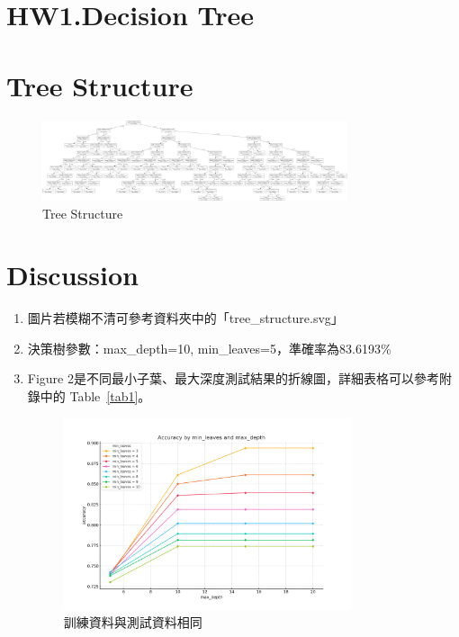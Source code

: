 \documentclass[11pt,a4paper]{extarticle}
\begin{document}
\section*{HW1.Decision Tree}

    \section*{Tree Structure}
    \begin{figure}[H]
        \centering
        \includegraphics[width=0.8\textwidth]{src/tree_structure.png}
        \caption{Tree Structure}
    \end{figure}

    \section*{Discussion}
    \begin{enumerate}
        \item 圖片若模糊不清可參考資料夾中的「tree\_structure.svg」
        \item 決策樹參數：max\_depth=10, min\_leaves=5，準確率為83.6193\%
        \item Figure 2是不同最小子葉、最大深度測試結果的折線圖，詳細表格可以參考附錄中的 Table~\ref{tab1}。

            \begin{figure}[H]
                \centering
                \includegraphics[width=0.8\textwidth]{src/picture1.png}
                \caption{訓練資料與測試資料相同}
            \end{figure}
        \newpage      
    \end{enumerate}
\end{document}

